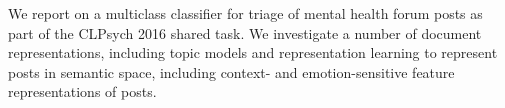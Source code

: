We report on a multiclass classifier for triage of mental health forum posts as part of the CLPsych 2016 shared task. We investigate a number of document representations, including topic models and representation learning to represent posts in semantic space, including context- and emotion-sensitive feature representations of posts.
